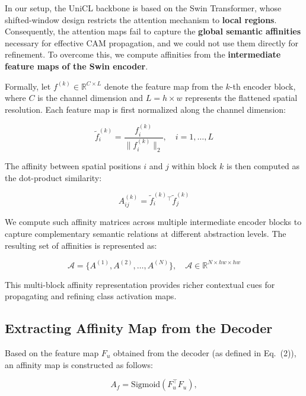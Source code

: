 In our setup, the UniCL backbone is based on the Swin Transformer, whose shifted-window design restricts the attention mechanism to \textbf{local regions}. Consequently, the attention maps fail to capture the \textbf{global semantic affinities} necessary for effective CAM propagation, and we could not use them directly for refinement. To overcome this, we compute affinities from the \textbf{intermediate feature maps of the Swin encoder}.  

Formally, let $f^{(k)} \in \mathbb{R}^{C \times L}$ denote the feature map from the $k$-th encoder block, where $C$ is the channel dimension and $L = h \times w$ represents the flattened spatial resolution. Each feature map is first normalized along the channel dimension:

\begin{equation}
\tilde{f}^{(k)}_i = \frac{f^{(k)}_i}{\| f^{(k)}_i \|_2}, \quad i = 1, \dots, L
\end{equation}

The affinity between spatial positions $i$ and $j$ within block $k$ is then computed as the dot-product similarity:

\begin{equation}
A^{(k)}_{ij} = \tilde{f}^{(k)}_i{}^\top \tilde{f}^{(k)}_j
\end{equation}

We compute such affinity matrices across multiple intermediate encoder blocks to capture complementary semantic relations at different abstraction levels. The resulting set of affinities is represented as:

\begin{equation}
\mathcal{A} = \{ A^{(1)}, A^{(2)}, \dots, A^{(N)} \}, \quad \mathcal{A} \in \mathbb{R}^{N \times hw \times hw}
\end{equation}

This multi-block affinity representation provides richer contextual cues for propagating and refining class activation maps.


\subsection{Extracting Affinity Map from the Decoder}
\label{subsec:decoder_aff_mat}
Based on the feature map $F_u$ obtained from the decoder (as defined in Eq.~(2)), an affinity map is constructed as follows:

\begin{equation}
    \label{eq: A_f}
    A_f = \text{Sigmoid}(F_u^\top F_u),
\end{equation}

